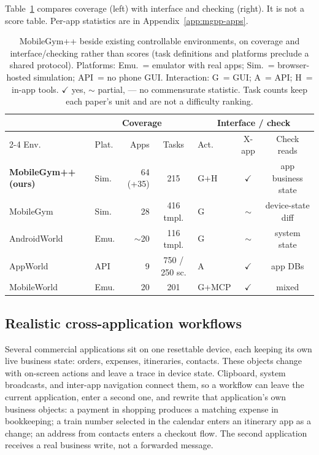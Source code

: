 Table~\ref{tab:mgpp-compare} compares coverage (left) with interface and checking (right). It is not a score table. Per-app statistics are in Appendix~\ref{app:mgpp-apps}.

\begin{table}[t]
\caption{MobileGym++ beside existing controllable environments, on coverage and interface/checking rather than scores (task definitions and platforms preclude a shared protocol). Platforms: Emu.\ = emulator with real apps; Sim.\ = browser-hosted simulation; API\ = no phone GUI. Interaction: G\ = GUI; A\ = API; H\ = in-app tools. $\checkmark$ yes, $\sim$ partial, --- no commensurate statistic. Task counts keep each paper's unit and are not a difficulty ranking.}
\label{tab:mgpp-compare}
\begin{center}
\scriptsize
\setlength{\tabcolsep}{3.5pt}
\begin{tabular}{llrclcc}
\hline
 & \multicolumn{3}{c}{Coverage} & \multicolumn{3}{c}{Interface / check} \\
\cline{2-4} \cline{5-7}
Env. & Plat. & Apps & Tasks & Act. & X-app & Check reads \\
\hline
\textbf{MobileGym++ (ours)} & Sim. & 64 (+35) & 215 & G+H & $\checkmark$ & app business state \\
MobileGym & Sim. & 28 & 416 tmpl. & G & $\sim$ & device-state diff \\
AndroidWorld & Emu. & $\sim$20 & 116 tmpl. & G & $\sim$ & system state \\
AppWorld & API & 9 & 750 / 250 sc. & A & $\checkmark$ & app DBs \\
MobileWorld & Emu. & 20 & 201 & G+MCP & $\checkmark$ & mixed \\
\hline
\end{tabular}
\end{center}
\end{table}

\subsection{Realistic cross-application workflows}
\label{sec:mgpp-crossapp}

Several commercial applications sit on one resettable device, each keeping its own live business state: orders, expenses, itineraries, contacts. These objects change with on-screen actions and leave a trace in device state. Clipboard, system broadcasts, and inter-app navigation connect them, so a workflow can leave the current application, enter a second one, and rewrite that application's own business objects: a payment in shopping produces a matching expense in bookkeeping; a train number selected in the calendar enters an itinerary app as a change; an address from contacts enters a checkout flow. The second application receives a real business write, not a forwarded message.

